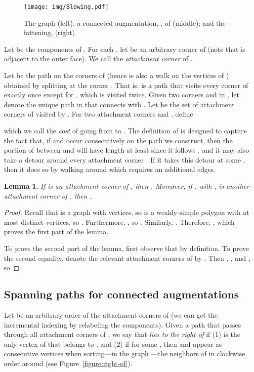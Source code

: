 \documentclass[11pt]{patmorin}
\newtheorem{lemma}[theorem]{Lemma}
\begin{document}
\begin{figure}[tb]
\centering
\texttt{[image: img/Blowing.pdf]}
\caption{The graph  (left); a connected augmentation, , of  (middle); and the -fattening,  (right).}
\label{fig:Blowing}
\end{figure}

Let  be the components of .
For each , let  be an arbitrary corner of  (note that  is adjacent to the outer face).
We call  the \emph{attachment corner} of .

Let  be the path on the corners of  (hence  is also a walk on the vertices of ) obtained by splitting  at the corner . That is,  is a path that visits every corner of  exactly once except for , which is visited twice.
Given two corners  and  in , let  denote
the unique path in  that connects  with . Let  be
the set of attachment corners of  visited by . For two attachment corners  and , define

which we call the \emph{cost} of going from  to .  The definition of  is designed to capture the fact that, if  and  occur consecutively on the path  we construct, then the portion of  between  and  will have length at least  since it follows , and it may also take a detour around every attachment corner .  If it takes this detour at some , then it does so by walking around  which requires an additional  edges.

\begin{lemma}\label{lemma:Contained in integer grid}
    If  is an attachment corner of , then . Moreover, if , with , is another attachment corner of , then
  .
\end{lemma}
\begin{proof}
Recall that  is a graph with  vertices, so 
is a weakly-simple polygon with at most  distinct vertices, so
.  Furthermore, , so .  Similarly,
.
Therefore, , which proves the first part of the lemma.

To prove the second part of the lemma, first observe that  by definition. To prove the second equality, denote
the relevant attachment corners of  by
. Then , , and
, so

\end{proof}

\subsection{Spanning paths for connected augmentations}\label{section:Spanning paths for connected augmentations}
Let  be an arbitrary order of the attachment corners of  (we can get the incremental indexing by relabeling the components). 
Given a path  that passes through all attachment corners of , we say that  \emph{lies to the right of}  if (1)  is the only vertex of  that belongs to , and (2) if  for some , then  and  appear as consecutive vertices when sorting---in the graph ---the neighbors of  in clockwise order around  (see Figure~\ref{figure:right-of}).
\end{document}
